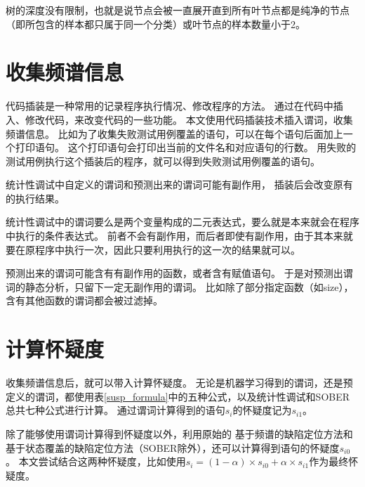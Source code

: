 树的深度没有限制，也就是说节点会被一直展开直到所有叶节点都是纯净的节点（即所包含的样本都只属于同一个分类）或叶节点的样本数量小于2。

\section{收集频谱信息}

代码插装是一种常用的记录程序执行情况、修改程序的方法。
通过在代码中插入、修改代码，来改变代码的一些功能。
本文使用代码插装技术插入谓词，收集频谱信息。
比如为了收集失败测试用例覆盖的语句，可以在每个语句后面加上一个打印语句。
这个打印语句会打印出当前的文件名和对应语句的行数。
用失败的测试用例执行这个插装后的程序，就可以得到失败测试用例覆盖的语句。

统计性调试中自定义的谓词和预测出来的谓词可能有副作用，
插装后会改变原有的执行结果。

统计性调试中的谓词要么是两个变量构成的二元表达式，要么就是本来就会在程序中执行的条件表达式。
前者不会有副作用，而后者即使有副作用，由于其本来就要在原程序中执行一次，因此只要利用执行的这一次的结果就可以。

预测出来的谓词可能含有有副作用的函数，或者含有赋值语句。
于是对预测出谓词的静态分析，只留下一定无副作用的谓词。
比如除了部分指定函数（如size），含有其他函数的谓词都会被过滤掉。

\section{计算怀疑度}

收集频谱信息后，就可以带入计算怀疑度。
无论是机器学习得到的谓词，还是预定义的谓词，都使用表\ref{susp_formula}中的五种公式，以及统计性调试和SOBER总共七种公式进行计算。
通过谓词计算得到的语句$s_i$的怀疑度记为$s_{i1}$。

除了能够使用谓词计算得到怀疑度以外，利用原始的
基于频谱的缺陷定位方法和基于状态覆盖的缺陷定位方法（SOBER除外），还可以计算得到语句的怀疑度$s_{i0}$。
本文尝试结合这两种怀疑度，比如使用$s_i = (1 - \alpha) \times s_{i0} + \alpha \times s_{i1}$作为最终怀疑度。

